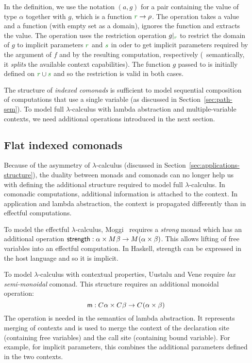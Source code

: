 \noindent
In the definition, we use the notation $(a, g)$ for a pair containing the value of type $\alpha$
together with $g$, which is a function $\cclrd{r} \rightarrow \rho$. The  operation
takes a value and a function (with empty set as a domain), ignores the function and extracts the
value. The  operation uses the restriction operation $\restr{g}{\cclrd{r}}$ to 
restrict the domain of $g$ to implicit parameters $\cclrd{r}$ and $\cclrd{s}$ in oder to get
implicit parameters required by the argument of $f$ and by the resulting computation, respectively
(\ie~semantically, it \emph{splits} the available context capabilities). The function $g$ passed 
to  is initially defined on $\cclrd{r} \cup \cclrd{s}$ and so the restriction is 
valid in both cases.

The structure of \emph{indexed comonads} is sufficient to model sequential composition of 
computations that use a single variable (as discussed in Section~\ref{sec:path-sem}). To model 
full $\lambda$-calculus with lambda abstraction and multiple-variable contexts, we need 
additional operations introduced in the next section.


\subsection{Flat indexed comonads}
\label{sec:flat-semantics-monoidal}

Because of the asymmetry of $\lambda$-calculus (discussed in Section~\ref{sec:applications-structure}),
the duality between monads and comonads can no longer help us with defining the additional structure
required to model full $\lambda$-calculus. In comonadic computations, additional information is attached
to the context. In application and lambda abstraction, the context is propagated differently than 
in effectful computations.

To model the effectful $\lambda$-calculus, Moggi~\cite{monad-notions} requires a \emph{strong} monad which
has an additional operation $\textnormal{\sffamily strength} : \alpha\times M^{}\beta \rightarrow M^{}(\alpha\times\beta)$.
This allows lifting of free variables into an effectful computation. In Haskell, strength can be expressed
in the host language and so it is implicit.

To model $\lambda$-calculus with contextual properties, Uustalu and Vene \cite{comonads-notions} 
require \emph{lax semi-monoidal} comonad. This structure requires an additional monoidal operation:
%
\begin{equation*}
\textnormal{\sffamily m} : C^{}\alpha \times C^{}\beta \rightarrow C^{}(\alpha \times \beta)
\end{equation*}
%
The  operation is needed in the semantics of lambda abstraction. It represents merging of 
contexts and is used to merge the context of the declaration site (containing free variables)
and the call site (containing bound variable). For example, for implicit parameters, this combines
the additional parameters defined in the two contexts.

